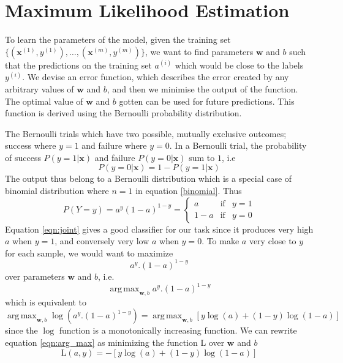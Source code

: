 \documentclass[12pt]{report}
\numberwithin{equation}{section}
\DeclareMathOperator*{\argmax}{arg\,max}
\begin{document}
\section{Maximum Likelihood Estimation}
To learn the parameters of the model, given the training set $\{(\bm{x}^{(1)},y^{(1)}),\hdots,(\bm{x}^{(m)},y^{(m)})\}$, we want to find parameters $\bm{w}$ and $b$ such that the predictions on the training set $a^{(i)}$ which would be close to the labels  $y^{(i)}$. We devise an error function, which describes the error created by any arbitrary values of $\bm{w}$ and $b$, and then we minimise the output of the function. The optimal value of $\bm{w}$ and $b$ gotten can be used for future predictions. This function is derived using the Bernoulli probability distribution. 

The Bernoulli trials which have two possible, mutually exclusive outcomes; success where $y=1$ and failure where $y=0$. In a Bernoulli trial, the probability of success $P(y=1|\bm{x})$ and failure $P(y=0|\bm{x})$ sum to $1$, i.e 
\begin{equation}\label{eqn:trial}
P(y=0|\bm{x}) = 1 - P(y=1|\bm{x})
\end{equation}
The output thus belong to a Bernoulli distribution which is a special case of binomial distribution where $n=1$ in equation \eqref{binomial}. Thus 
\begin{equation}\label{eqn:joint}
P(Y=y) = a^y(1-a)^{1-y}=\left\{\begin{array}{lcc}
						a & \text{if} & y=1 \\
						1-a & \text{if} & y=0
						\end{array}\right.
\end{equation}
Equation \eqref{eqn:joint} gives a good classifier for our task since it produces very high $a$ when $y=1$, and conversely very low $a$ when $y=0$. To make $a$  very close to $y$ for each sample, we would want to maximize 
\[ a^y.(1-a)^{1-y} \]
over parameters $\bm{w}$ and $b$, i.e.
\[ \argmax_{\textbf{w},b} a^y.(1-a)^{1-y} \]
which is equivalent to
\begin{equation}\label{eqn:arg_max}
\argmax_{\textbf{w},b} \log(a^y.(1-a)^{1-y}) = \argmax_{\textbf{w},b} [y\log(a) + (1-y)\log(1-a)]
\end{equation}
since the $\log$ function is a monotonically increasing function. We can rewrite equation \eqref{eqn:arg_max} as minimizing the function $\mathrm{L}$ over $\bm{w}$ and $b$ 
\begin{equation}\label{eqn:loss}
\mathrm{L}(a,y) = -[y\log(a) + (1-y)\log(1-a)]
\end{equation}
\end{document}
